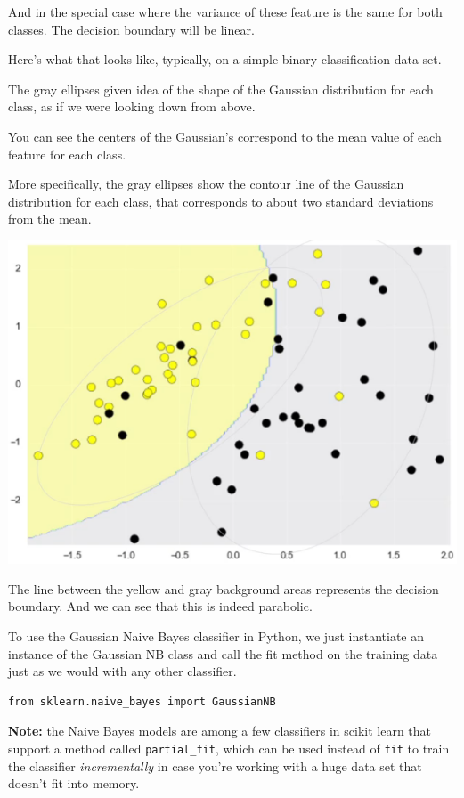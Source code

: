 And in the special case where the variance of these feature is the same for both classes. The decision boundary will be linear. 

Here's what that looks like, typically, on a simple binary classification data set. 

The gray ellipses given idea of the shape of the Gaussian distribution for each class, as if we were looking down from above. 

You can see the centers of the Gaussian's correspond to the mean value of each feature for each class. 

More specifically, the gray ellipses show the contour line of the Gaussian distribution for each class, that corresponds to about two standard deviations from the mean. 

\begin{center}
	\includegraphics[width=\linewidth]{img/Gaussian-Naive-Bayes-Classifier-1.png} 
\end{center}


The line between the yellow and gray background areas represents the decision boundary. And we can see that this is indeed parabolic. 

To use the Gaussian Naive Bayes classifier in Python, 
we just instantiate an instance of the Gaussian NB class and call the fit method on the training data just as we would with any other classifier. 

\begin{verbatim}
from sklearn.naive_bayes import GaussianNB
\end{verbatim}

\textbf{Note:} the Naive Bayes models are among a few classifiers in scikit learn that support a method called \texttt{partial_fit},  which can be used instead of \texttt{fit} to train the classifier \emph{incrementally} in case you're working with a huge data set that doesn't fit into memory. 

